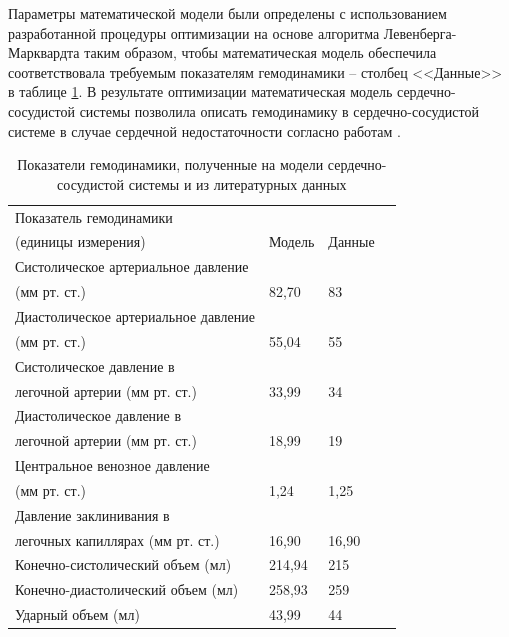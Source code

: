 Параметры математической модели были определены с использованием разработанной процедуры оптимизации на основе алгоритма Левенберга-Марквардта таким образом, чтобы математическая модель обеспечила соответствовала требуемым показателям гемодинамики -- столбец <<Данные>> в таблице \ref{tbl:cvs_model_reference_comparison}. В результате оптимизации математическая модель сердечно-сосудистой системы позволила описать гемодинамику в сердечно-сосудистой системе в случае сердечной недостаточности согласно работам \cite{Cox_2009, Martina_2013_simulation}. 

\begin{table} [htbp]%
    \centering
	\caption{Показатели гемодинамики, полученные на модели сердечно-сосудистой системы и из литературных данных}%
	\label{tbl:cvs_model_reference_comparison}
    \renewcommand{\arraystretch}{1.5} 
	\begin{tabular}{@{}@{\extracolsep{20pt}}llll@{}} 
        \toprule     %
    	Показатель гемодинамики \\(единицы измерения)	& Модель  & Данные \\
        \midrule %
    	Систолическое артериальное давление \\(мм рт. ст.) & 82,70 & 83 \\
    	Диастолическое артериальное давление \\(мм рт. ст.) & 55,04 	 & 55	 \\
    	Систолическое давление в \\ легочной артерии (мм рт. ст.)	& 33,99 	 & 34 \\
		Диастолическое давление в \\легочной артерии (мм рт. ст.)	& 18,99 	 & 19 \\
		Центральное венозное давление \\(мм рт. ст.)	& 1,24 & 1,25 \\
		Давление заклинивания в \\легочных капиллярах (мм рт. ст.)	& 16,90 	 & 16,90 \\
		Конечно-систолический объем (мл)	& 214,94 	 & 215 \\
		Конечно-диастолический объем (мл)	& 258,93 	 & 259 \\
		Ударный объем (мл)	& 43,99 & 44 \\
        \bottomrule 
	\end{tabular}%
\end{table}

